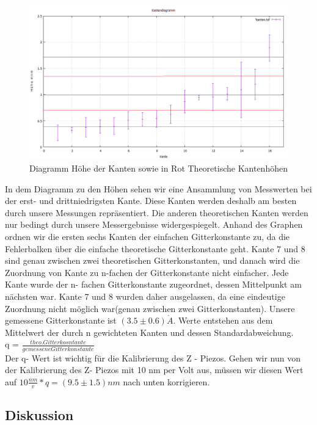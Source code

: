 \documentclass[10pt,a4paper]{article}
\begin{document}
\begin{figure}[]
	\includegraphics[scale = 0.5]{kantendia.png}
	\centering
	\caption{Diagramm Höhe der Kanten sowie in Rot Theoretische Kantenhöhen}
	\label{kantendia}
\end{figure}

In dem Diagramm zu den Höhen sehen wir eine Ansammlung von Messwerten bei der erst- und drittniedrigsten Kante. Diese Kanten werden deshalb am besten durch unsere Messungen repräsentiert. Die anderen theoretischen Kanten werden nur bedingt durch unsere Messergebnisse widergespiegelt.
Anhand des Graphen ordnen wir die ersten sechs Kanten der einfachen Gitterkonstante zu, da die Fehlerbalken über die einfache theoretische Gitterkonstante geht. Kante 7 und 8 sind genau zwischen zwei theoretischen Gitterkonstanten, und danach wird die Zuordnung von Kante zu n-fachen der Gitterkonstante nicht einfacher.
Jede Kante wurde der n- fachen Gitterkonstante zugeordnet, dessen Mittelpunkt am nächsten war. Kante 7 und 8 wurden daher ausgelassen, da eine eindeutige Zuordnung nicht möglich war(genau zwischen zwei Gitterkonstanten). Unsere gemessene Gitterkonstante ist $(3.5 \pm 0.6) \mathring{A}$. Werte entstehen aus dem Mittelwert der durch n gewichteten Kanten und dessen Standardabweichung. \\ 
q =  $\frac {theo. Gitterkosntante} {gemessene Gitterkonstante}$\\
Der q- Wert ist wichtig für die Kalibrierung des Z - Piezos.
Gehen wir nun von der Kalibrierung des Z- Piezos mit 10 nm per Volt aus, müssen wir diesen Wert auf $10 \frac {nm} {v} * q = (9.5 \pm1.5)nm$ nach unten korrigieren.



\subsection{ Diskussion}
\end{document}
